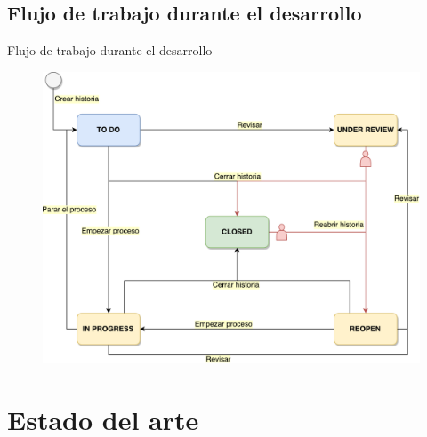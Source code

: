 \documentclass[10pt,xcolor=table ]{beamer}
\begin{document}
\subsection{Flujo de trabajo durante el desarrollo}
\begin{frame}{Flujo de trabajo durante el desarrollo}
	\begin{figure}
		\centering
	    \includegraphics[scale=0.35]{../Figuras/workflow}
	\end{figure}
\end{frame}

\section{Estado del arte}
\end{document}
